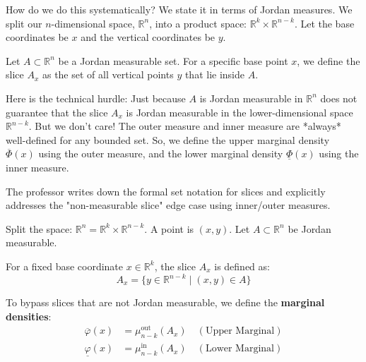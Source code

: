 \begin{spoken-clean}[00:42:00 - 00:46:30]
How do we do this systematically? We state it in terms of Jordan measures. We split our $n$-dimensional space, $\mathbb{R}^n$, into a product space: $\mathbb{R}^k \times \mathbb{R}^{n-k}$. Let the base coordinates be $x$ and the vertical coordinates be $y$. 

Let $A \subset \mathbb{R}^n$ be a Jordan measurable set. For a specific base point $x$, we define the slice $A_x$ as the set of all vertical points $y$ that lie inside $A$. 

Here is the technical hurdle: Just because $A$ is Jordan measurable in $\mathbb{R}^n$ does not guarantee that the slice $A_x$ is Jordan measurable in the lower-dimensional space $\mathbb{R}^{n-k}$. But we don't care! The outer measure and inner measure are *always* well-defined for any bounded set. So, we define the upper marginal density $\overline{\Phi}(x)$ using the outer measure, and the lower marginal density $\underline{\Phi}(x)$ using the inner measure.
\end{spoken-clean}

\begin{nice-box}
The professor writes down the formal set notation for slices and explicitly addresses the "non-measurable slice" edge case using inner/outer measures.
\end{nice-box}

\begin{math-stroke}
Split the space: $\mathbb{R}^n = \mathbb{R}^k \times \mathbb{R}^{n-k}$. A point is $(x,y)$.
Let $A \subset \mathbb{R}^n$ be Jordan measurable.
\end{math-stroke}

\begin{orange-formula}
\begin{definition}[Slices]
For a fixed base coordinate $x \in \mathbb{R}^k$, the slice $A_x$ is defined as:
\[
A_x = \{ y \in \mathbb{R}^{n-k} \mid (x,y) \in A \}
\]
\end{definition}
\end{orange-formula}

\begin{math-stroke}
To bypass slices that are not Jordan measurable, we define the \textbf{marginal densities}:
\begin{align*}
\overline{\varphi}(x) &= \mu_{n-k}^{\text{out}}(A_x) \quad (\text{Upper Marginal}) \\
\underline{\varphi}(x) &= \mu_{n-k}^{\text{in}}(A_x) \quad (\text{Lower Marginal})
\end{align*}
\end{math-stroke}

